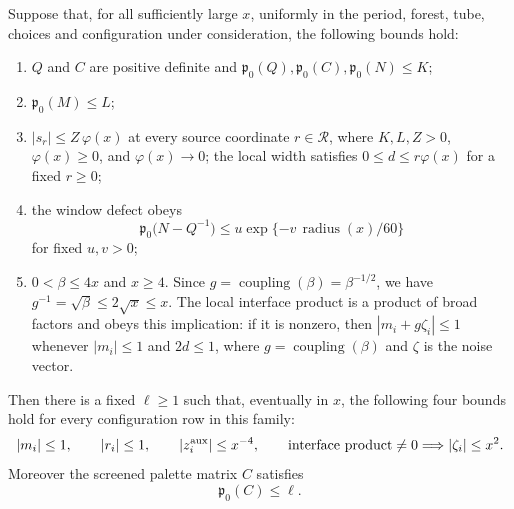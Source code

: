 \begin{proposition}
\label{prop:actual-palette-response}
Suppose that, for all sufficiently large $x$, uniformly in the period,
forest, tube, choices and configuration under consideration, the following
bounds hold:
\begin{enumerate}
\item $Q$ and $C$ are positive definite and
      $\mathfrak p_0(Q),\mathfrak p_0(C),\mathfrak p_0(N)\leq K$;
\item $\mathfrak p_0(M)\leq L$;
\item $|s_r|\leq Z\,\varphi(x)$ at every source coordinate $r\in\mathcal R$, where
      $K,L,Z>0$, $\varphi(x)\geq0$, and $\varphi(x)\to0$; the local
      width satisfies $0\leq d\leq r\varphi(x)$ for a fixed $r\geq0$;
\item the window defect obeys
\[
 \mathfrak p_0\bigl(N-Q^{-1}\bigr)
       \leq u\exp\{-v\,\operatorname{radius}(x)/60\}
\]
for fixed $u,v>0$;
\item $0<\beta\leq4x$ and $x\geq4$. Since
      $g=\operatorname{coupling}(\beta)=\beta^{-1/2}$, we have
      $g^{-1}=\sqrt\beta\leq2\sqrt x\leq x$. The local interface product
      is a product of broad factors and obeys this implication: if it is
      nonzero, then $|m_i+g\zeta_i|\leq1$ whenever $|m_i|\leq1$ and
      $2d\leq1$, where $g=\operatorname{coupling}(\beta)$ and $\zeta$
      is the noise vector.
\end{enumerate}
Then there is a fixed $\ell\geq1$ such that, eventually in $x$, the
following four bounds hold for every configuration row in this family:
\[
 |m_i|\leq1,\qquad |r_i|\leq1,\qquad |z_i^{\rm aux}|\leq x^{-4},
 \qquad \text{interface product}\ne0\Longrightarrow
 |\zeta_i|\leq x^2.
\]
Moreover the screened palette matrix $C$ satisfies
\[
 \mathfrak p_0(C)\leq\ell.
\]
\end{proposition}
